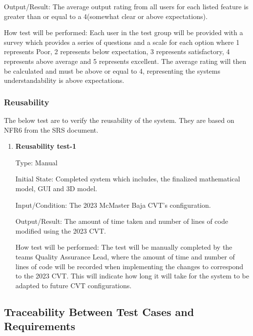 \documentclass[12pt, titlepage]{article}
\begin{document}
\begin{enumerate}
Output/Result: The average output rating from all users for each listed feature is greater than or equal to a 4(somewhat clear or above expectations).
					
How test will be performed: Each user in the test group will be provided with a survey which provides a series of questions and a scale for each option where 1 represents Poor, 2 represents below expectation, 3 represents satisfactory, 4 represents above average and 5 represents excellent.
The average rating will then be calculated and must be above or equal to 4, representing the systems understandability is above expectations. 

\end{enumerate}

\subsubsection{Reusability}

The below test are to verify the reusability of the system.
They are based on NFR6 from the SRS document.

\begin{enumerate}

  \item {} \hypertarget{Reusability test-1}{\textbf{Reusability test-1}} \label{Reusability test-1}
    
Type: Manual
              
Initial State: Completed system which includes, the finalized mathematical model, GUI and 3D model.  
              
Input/Condition: The 2023 McMaster Baja CVT's configuration. 
              
Output/Result: The amount of time taken and number of lines of code modified using the 2023 CVT.
              
How test will be performed: The test will be manually completed by the teams Quality Assurance Lead, where the amount of time and number of lines of code will be recorded when implementing the changes to correspond to the 2023 CVT.
This will indicate how long it will take for the system to be adapted to future CVT configurations. 
    
\end{enumerate}

\subsection{Traceability Between Test Cases and Requirements}
\end{document}
